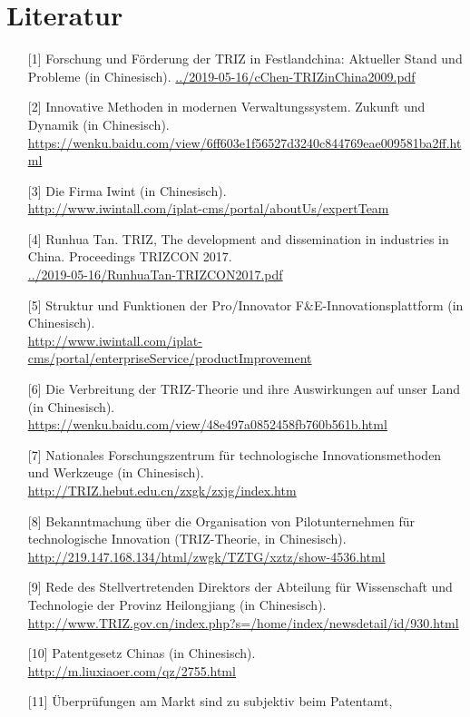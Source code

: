 \documentclass[11pt,a4paper]{article}
\begin{document}
\section{Literatur}
\begin{itemize}
\item[{[1]}] Forschung und Förderung der TRIZ in Festlandchina: Aktueller
  Stand und Probleme (in Chinesisch).
  \url{../2019-05-16/cChen-TRIZinChina2009.pdf} 
\item[{[2]}] Innovative Methoden in modernen Verwaltungssystem. Zukunft und
  Dynamik (in Chinesisch).\\{\small
  \url{https://wenku.baidu.com/view/6ff603e1f56527d3240c844769eae009581ba2ff.html}} 
\item[{[3]}] Die Firma Iwint (in Chinesisch).\\
  \url{http://www.iwintall.com/iplat-cms/portal/aboutUs/expertTeam}
\item[{[4]}] Runhua Tan. TRIZ, The development and dissemination in industries
  in China.  Proceedings TRIZCON 2017.\\
  \url{../2019-05-16/RunhuaTan-TRIZCON2017.pdf}
\item[{[5]}] Struktur und Funktionen der Pro/Innovator
  F\&E-Innovationsplattform (in Chinesisch).\\{\small
  \url{http://www.iwintall.com/iplat-cms/portal/enterpriseService/productImprovement}}
\item[{[6]}] Die Verbreitung der TRIZ-Theorie und ihre Auswirkungen auf unser
  Land (in Chinesisch).
  \url{https://wenku.baidu.com/view/48e497a0852458fb760b561b.html}
\item[{[7]}] Nationales Forschungszentrum für technologische
  Innovationsmethoden und Werkzeuge (in Chinesisch).
  \url{http://TRIZ.hebut.edu.cn/zxgk/zxjg/index.htm}
\item[{[8]}] Bekanntmachung über die Organisation von Pilotunternehmen für
  technologische Innovation (TRIZ-Theorie, in Chinesisch).\\
  \url{http://219.147.168.134/html/zwgk/TZTG/xztz/show-4536.html}
\item[{[9]}] Rede des Stellvertretenden Direktors der Abteilung für
  Wissenschaft und Technologie der Provinz Heilongjiang (in Chinesisch).\\
  \url{http://www.TRIZ.gov.cn/index.php?s=/home/index/newsdetail/id/930.html}
\item[{[10]}] Patentgesetz Chinas (in Chinesisch).
  \url{http://m.liuxiaoer.com/qz/2755.html}
\item[{[11]}] Überprüfungen am Markt sind zu subjektiv beim Patentamt,

\end{itemize}
\end{document}
